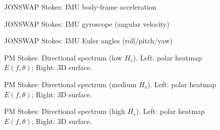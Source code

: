 \documentclass[11pt,letterpaper]{article}
\begin{document}
\begin{figure}[H]\centering
  \resizebox{\textwidth}{!}{}
  \caption{JONSWAP Stokes: IMU body-frame acceleration}
  \label{fig:jonswap_imu_acc}
\end{figure}

\begin{figure}[H]\centering
  \resizebox{\textwidth}{!}{}
  \caption{JONSWAP Stokes: IMU gyroscope (angular velocity)}
  \label{fig:jonswap_imu_gyro}
\end{figure}

\begin{figure}[H]\centering
  \resizebox{\textwidth}{!}{}
  \caption{JONSWAP Stokes: IMU Euler angles (roll/pitch/yaw)}
  \label{fig:jonswap_euler}
\end{figure}


\begin{figure}[H]\centering
  \begin{minipage}{0.49\textwidth}
    \resizebox{\linewidth}{!}{}
  \end{minipage}\hfill
  \begin{minipage}{0.49\textwidth}
    \resizebox{\linewidth}{!}{}
  \end{minipage}
  \caption{PM Stokes: Directional spectrum (low $H_s$). Left: polar heatmap $E(f,\theta)$; Right: 3D surface.}
  \label{fig:pmstokes_spec_low}
\end{figure}

\begin{figure}[H]\centering
  \begin{minipage}{0.49\textwidth}
    \resizebox{\linewidth}{!}{}
  \end{minipage}\hfill
  \begin{minipage}{0.49\textwidth}
    \resizebox{\linewidth}{!}{}
  \end{minipage}
  \caption{PM Stokes: Directional spectrum (medium $H_s$). Left: polar heatmap $E(f,\theta)$; Right: 3D surface.}
  \label{fig:pmstokes_spec_medium}
\end{figure}

\begin{figure}[H]\centering
  \begin{minipage}{0.49\textwidth}
    \resizebox{\linewidth}{!}{}
  \end{minipage}\hfill
  \begin{minipage}{0.49\textwidth}
    \resizebox{\linewidth}{!}{}
  \end{minipage}
  \caption{PM Stokes: Directional spectrum (high $H_s$). Left: polar heatmap $E(f,\theta)$; Right: 3D surface.}
  \label{fig:pmstokes_spec_high}
\end{figure}
\end{document}
